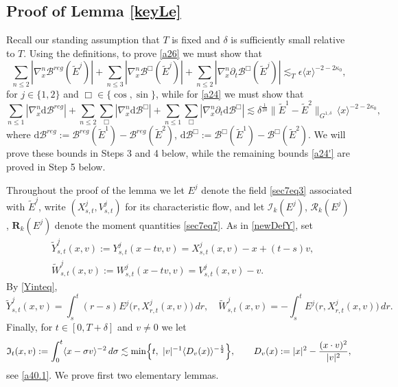 \documentclass[reqno,11pt]{amsart}
\numberwithin{equation}{section}
\begin{document}
	\subsection{Proof of Lemma \ref{keyLe}}\label{subsection7.1} Recall our standing assumption that $T$ is fixed and $\delta$ is sufficiently small relative to $T$. Using the definitions, to prove \eqref{a26} we must show that
	\begin{equation}\label{s7B4}
		\sum_{n\leq2}|\nabla_x^n\mathcal B^{reg}(\tilde E^j)|
		+\sum_{n\leq3}|\nabla_x^n\mathcal B^{\Box}(\tilde E^j)|
		+\sum_{n\leq2}|\nabla_x^n\partial_t\mathcal B^{\Box}(\tilde E^j)|
		\lesssim_T\epsilon\langle x\rangle^{-2-2\kappa_0},
	\end{equation}
	for $j\in\{1,2\}$ and $\Box\in \{\cos,\sin\}$, while for \eqref{a24} we must show that
	\begin{equation}\label{s7B5}
		\sum_{n\leq1}|\nabla_x^n\mathrm d\mathcal B^{reg}|
		+\sum_{n\leq2}\sum_{\Box}|\nabla_x^n\mathrm d\mathcal B^{\Box}|
		+\sum_{n\leq1}\sum_{\Box}|\nabla_x^n\partial_t\mathrm d\mathcal B^{\Box}|
		\lesssim\delta^{\frac1{20}}\|\tilde{E}^1-\tilde{E}^2\|_{G^{1,\delta}}\,\langle x\rangle^{-2-2\kappa_0},
	\end{equation}
	where $\mathrm d\mathcal B^{reg}:=\mathcal B^{reg}(\tilde E^1)-\mathcal B^{reg}(\tilde E^2)$, $\mathrm d\mathcal B^{\Box}:=\mathcal B^{\Box}(\tilde E^1)-\mathcal B^\Box(\tilde E^2)$. We will prove these bounds in Steps 3 and 4 below, while the remaining bounds \eqref{a24'} are proved in Step 5 below.
	
Throughout the proof of the lemma we let $E^j$ denote the field
	\eqref{sec7eq3} associated with $\tilde E^j$, write $(X^j_{s,t},V^j_{s,t})$ for its
	characteristic flow, and let $\mathcal I_k(E^j)$, $\mathcal R_k(E^j)$, $\mathbf R_k(E^j)$ denote the
	moment quantities \eqref{sec7eq7}. As in \eqref{newDefY}, set
	\begin{equation}\label{s7c2}
	\begin{split}
		&\widetilde Y^j_{s,t}(x,v):=Y^j_{s,t}(x-tv,v)=X^j_{s,t}(x,v)-x+(t-s)v,\\
		&\widetilde W^j_{s,t}(x,v):=W^j_{s,t}(x-tv,v)=V^j_{s,t}(x,v)-v.
	\end{split}
	\end{equation}
	By \eqref{Yinteq},
	\begin{equation}\label{s7c3}
		\widetilde Y^j_{s,t}(x,v)=\int_s^t(r-s)E^j\bigl(r,X^j_{r,t}(x,v)\bigr)\,dr,
		\quad
		\widetilde W^j_{s,t}(x,v)=-\int_s^tE^j\bigl(r,X^j_{r,t}(x,v)\bigr)\,dr .
	\end{equation}
	Finally, for $t\in[0,T+\delta]$ and $v\neq 0$ we let
	\begin{equation}\label{s7c4}
		\mathfrak I_t(x,v):=\int_0^t\langle x-\sigma v\rangle^{-2}\,d\sigma
		\lesssim\min\Bigl\{t,\ |v|^{-1}\langle D_v(x)\rangle^{-\frac12}\Bigr\},
		\qquad
		D_v(x):=|x|^2-\frac{(x\cdot v)^2}{|v|^2},
	\end{equation}
	see \eqref{a40.1}. We prove first two elementary lemmas. 
	
\end{document}
